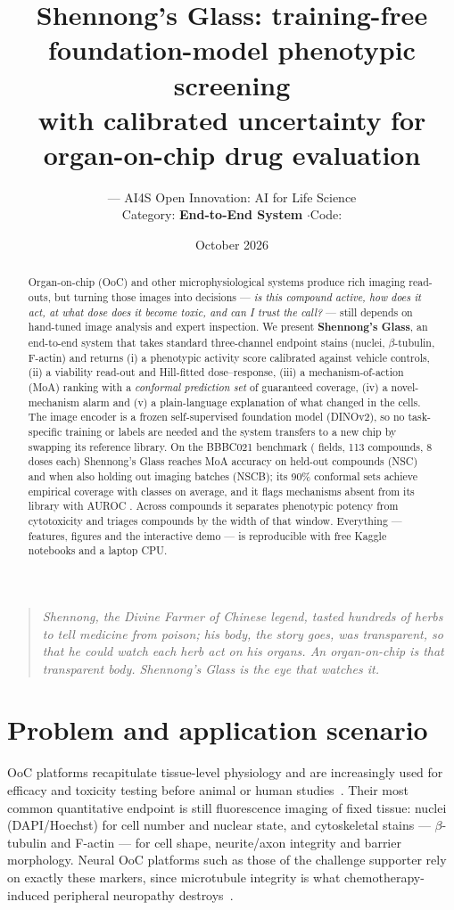 \documentclass[11pt,a4paper]{article}
\title{\textbf{Shennong's Glass}: training-free foundation-model phenotypic screening\\
with calibrated uncertainty for organ-on-chip drug evaluation}
\author{\TeamName --- AI4S Open Innovation: AI for Life Science\\[2pt]
\small Category: \textbf{End-to-End System} \quad$\cdot$\quad Code: \repo}
\date{October 2026}
\begin{document}
\maketitle

\begin{abstract}
Organ-on-chip (OoC) and other microphysiological systems produce rich imaging read-outs, but
turning those images into decisions --- \emph{is this compound active, how does it act, at what
dose does it become toxic, and can I trust the call?} --- still depends on hand-tuned image
analysis and expert inspection. We present \textbf{Shennong's Glass}, an end-to-end system that takes
standard three-channel endpoint stains (nuclei, $\beta$-tubulin, F-actin) and returns (i) a
phenotypic activity score calibrated against vehicle controls, (ii) a viability read-out and
Hill-fitted dose--response, (iii) a mechanism-of-action (MoA) ranking with a
\emph{conformal prediction set} of guaranteed coverage, (iv) a novel-mechanism alarm and (v) a
plain-language explanation of what changed in the cells. The image encoder is a frozen
self-supervised foundation model (DINOv2), so no task-specific training or labels are needed and
the system transfers to a new chip by swapping its reference library. On the BBBC021 benchmark
(\NImages{} fields, 113 compounds, 8 doses each) Shennong's Glass reaches \NSCfusion{} MoA accuracy on
held-out compounds (NSC) and \NSCBfusion{} when also holding out imaging batches (NSCB);
its 90\% conformal sets achieve \CovNinety{} empirical coverage with \SizeNinety{} classes on
average, and it flags mechanisms absent from its library with AUROC \NoveltyAUROC. Across
\NCompounds{} compounds it separates phenotypic potency from cytotoxicity and triages compounds by
the width of that window. Everything --- features, figures and the interactive demo --- is
reproducible with free Kaggle notebooks and a laptop CPU.
\end{abstract}

\begin{quote}\small\itshape
Shennong, the Divine Farmer of Chinese legend, tasted hundreds of herbs to tell medicine from
poison; his body, the story goes, was transparent, so that he could watch each herb act on his
organs. An organ-on-chip is that transparent body. Shennong's Glass is the eye that watches it.
\end{quote}

\section{Problem and application scenario}
OoC platforms recapitulate tissue-level physiology and are increasingly used for efficacy and
toxicity testing before animal or human studies~\cite{ingber2022,low2021}. Their most common
quantitative endpoint is still fluorescence imaging of fixed tissue: nuclei (DAPI/Hoechst) for
cell number and nuclear state, and cytoskeletal stains --- $\beta$-tubulin and F-actin --- for cell
shape, neurite/axon integrity and barrier morphology. Neural OoC platforms such as those of the
challenge supporter rely on exactly these markers, since microtubule integrity is what
chemotherapy-induced peripheral neuropathy destroys~\cite{staff2017}.
\end{document}
